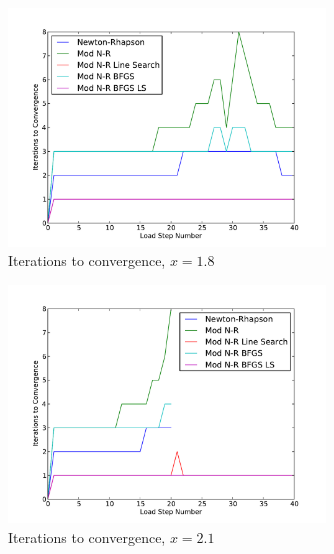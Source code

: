 \documentclass[12pt]{article}
\begin{document}
\begin{figure}[h!]
\centering
\includegraphics[width=0.75\textwidth]{Iter18.pdf}
\caption{Iterations to convergence, $x=1.8$}
\end{figure}
\begin{figure}[h!]
\centering
\includegraphics[width=0.75\textwidth]{Iter21.pdf}
\caption{Iterations to convergence, $x=2.1$}
\end{figure}

\clearpage
\newpage

\end{document}
